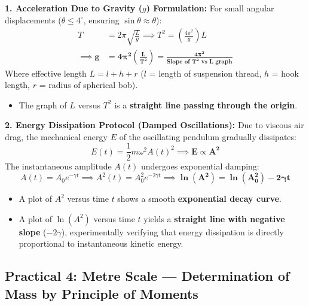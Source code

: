 \documentclass[10pt,twoside,openright]{book}
\begin{document}
\begin{conceptbox}
\textbf{1. Acceleration Due to Gravity ($g$) Formulation:}
For small angular displacements ($\theta \le 4^\circ$, ensuring $\sin\theta \approx \theta$):
\begin{align}
  T &= 2\pi\sqrt{\frac{L}{g}} \implies T^2 = \left(\frac{4\pi^2}{g}\right)L \\
  \implies \mathbf{g} &= \mathbf{4\pi^2 \left(\frac{L}{T^2}\right) = \frac{4\pi^2}{\text{Slope of } T^2 \text{ vs } L \text{ graph}}}
\end{align}
Where effective length $L = l + h + r$ ($l$ = length of suspension thread, $h$ = hook length, $r$ = radius of spherical bob).
\begin{itemize}
  \item The graph of $L$ versus $T^2$ is a \textbf{straight line passing through the origin}.
\end{itemize}
\textbf{2. Energy Dissipation Protocol (Damped Oscillations):}
Due to viscous air drag, the mechanical energy $E$ of the oscillating pendulum gradually dissipates:
\begin{equation}
  E(t) = \frac{1}{2}m\omega^2 A(t)^2 \implies \mathbf{E \propto A^2}
\end{equation}
The instantaneous amplitude $A(t)$ undergoes exponential damping:
\begin{equation}
  A(t) = A_0 e^{-\gamma t} \implies A^2(t) = A_0^2 e^{-2\gamma t} \implies \mathbf{\ln(A^2) = \ln(A_0^2) - 2\gamma t}
\end{equation}
\begin{itemize}
  \item A plot of $A^2$ versus time $t$ shows a smooth \textbf{exponential decay curve}.
  \item A plot of $\ln(A^2)$ versus time $t$ yields a \textbf{straight line with negative slope} ($-2\gamma$), experimentally verifying that energy dissipation is directly proportional to instantaneous kinetic energy.
\end{itemize}
\end{conceptbox}

\subsection{Practical 4: Metre Scale --- Determination of Mass by Principle of Moments}
\end{document}
